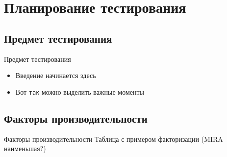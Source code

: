 \section{Планирование тестирования}

\subsection{Предмет тестирования}
\begin{frame}{Предмет тестирования}
	\begin{itemize}
	 \item Введение начинается здесь
	 \item Вот \texttt{так} можно выделить важные моменты
	\end{itemize}
\end{frame}

\subsection{Факторы производительности}
\begin{frame}{Факторы производительности}
	Таблица с примером факторизации (MIRA наименьшая?)
\end{frame}
